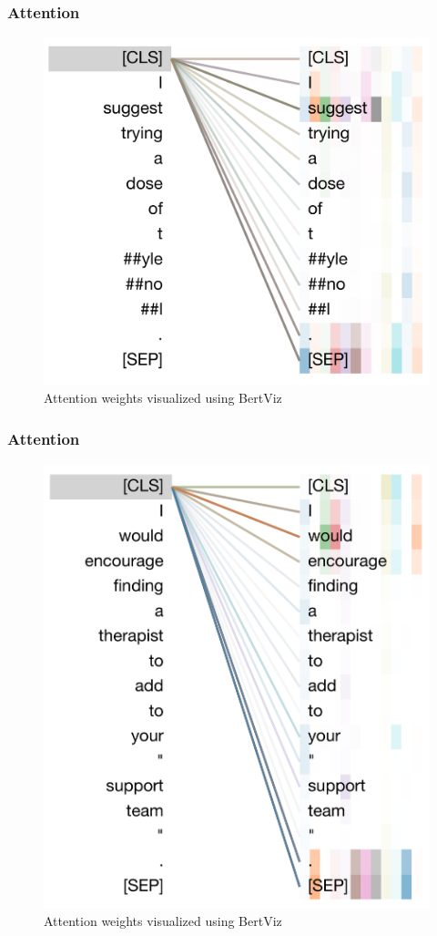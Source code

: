 \begin{frame}[c]\frametitle{Attention}
   \begin{figure}
       \centering
       \includegraphics[width=0.75\linewidth]{figures/att-2.png}
       \caption{Attention weights visualized using BertViz~\citep{vig2019transformervis}}
   \end{figure}
\end{frame}

\begin{frame}[c]\frametitle{Attention}
    \begin{figure}
        \centering
        \includegraphics[width=0.6\linewidth]{figures/att-1.png}
        \caption{Attention weights visualized using BertViz~\citep{vig2019transformervis}}
    \end{figure}
\end{frame}